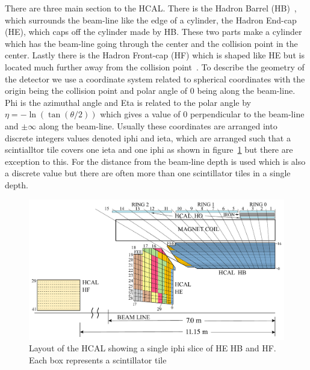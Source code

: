 There are three main section to the HCAL. There is the Hadron Barrel (HB)~\cite{HB}, which surrounds the beam-line like the edge of a cylinder, the Hadron End-cap (HE), which caps off the cylinder made by HB. These two parts make a cylinder which has the beam-line going through the center and the collision point in the center. Lastly there is the Hadron Front-cap (HF) which is shaped like HE but is located much further away from the collision point~\cite{HF}. To describe the geometry of the detector we use a coordinate system related to spherical coordinates with the origin being the collision point and polar angle of 0 being along the beam-line. Phi is the azimuthal angle and Eta is related to the polar angle by $\eta = -\ln(\tan(\theta/2))$ which gives a value of 0 perpendicular to the beam-line and $\pm\infty$ along the beam-line. Usually these coordinates are arranged into discrete integers values denoted iphi and ieta, which are arranged such that a scintialltor tile covers one ieta and one iphi as shown in figure~\ref{fig:Depth} but there are exception to this. For the distance from the beam-line depth is used which is also a discrete value but there are often more than one scintillator tiles in a single depth. 

\begin{figure}
\centering
\includegraphics[width=\linewidth]{Figures/Depthsegmentation.pdf}
\caption{Layout of the HCAL showing a single iphi slice of HE HB and HF. Each box represents a scintillator tile}
\label{fig:Depth}
\end{figure}

